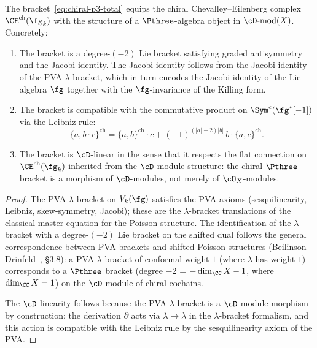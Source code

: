 \begin{proposition}
\label{prop:chiral-p3-structure}
\ClaimStatusProvedHere
The bracket~\eqref{eq:chiral-p3-total} equips the chiral
Chevalley--Eilenberg complex $\CE^{\mathrm{ch}}(\fg_k)$
with the structure of a $\Pthree$-algebra object in
$\cD\textrm{-}\mathrm{mod}(X)$. Concretely:
\begin{enumerate}[label=\textup{(\roman*)}]
\item The bracket is a degree-$(-2)$ Lie bracket satisfying
 graded antisymmetry and the Jacobi identity.
 The Jacobi identity follows from the Jacobi identity of the
 PVA $\lambda$-bracket, which in turn encodes the Jacobi
 identity of the Lie algebra $\fg$ together with the
 $\fg$-invariance of the Killing form.
\item The bracket is compatible with the commutative product
 on $\Sym^c(\fg^*[-1])$ via the Leibniz rule:
 \[
 \{a, b \cdot c\}^{\mathrm{ch}}
 = \{a, b\}^{\mathrm{ch}} \cdot c
 + (-1)^{(|a|-2)|b|}\, b \cdot \{a, c\}^{\mathrm{ch}}.
 \]
\item The bracket is $\cD$-linear in the sense that it
 respects the flat connection on
 $\CE^{\mathrm{ch}}(\fg_k)$ inherited from the
 $\cD$-module structure: the chiral $\Pthree$ bracket
 is a morphism of $\cD$-modules, not merely of
 $\cO_X$-modules.
\end{enumerate}
\end{proposition}

\begin{proof}
The PVA $\lambda$-bracket on $V_k(\fg)$ satisfies the PVA
axioms (sesquilinearity, Leibniz, skew-symmetry, Jacobi);
these are the $\lambda$-bracket translations of the classical
master equation for the Poisson structure.
The identification of the $\lambda$-bracket with a
degree-$(-2)$ Lie bracket on the shifted dual follows the
general correspondence between PVA brackets and shifted
Poisson structures (Beilinson--Drinfeld~\cite{BD04},
\S3.8): a PVA $\lambda$-bracket of conformal weight $1$
(where $\lambda$ has weight $1$) corresponds to a
$\Pthree$ bracket (degree $-2$ = $-\dim_\CC X - 1$, where
$\dim_\CC X = 1$) on the $\cD$-module of chiral cochains.

The $\cD$-linearity follows because the PVA
$\lambda$-bracket is a $\cD$-module morphism by construction:
the derivation $\partial$ acts via $\lambda \mapsto \lambda$
in the $\lambda$-bracket formalism, and this action is
compatible with the Leibniz rule by the sesquilinearity
axiom of the PVA.
\end{proof}

